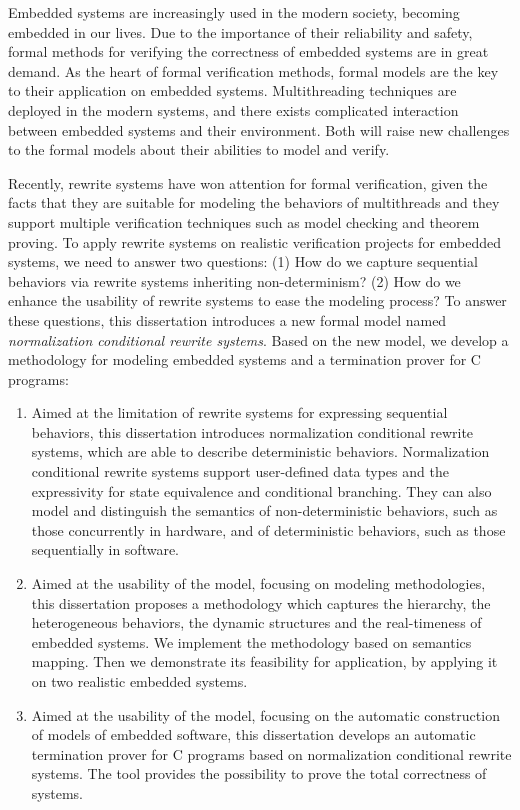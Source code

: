 \begin{eabstract}

Embedded systems are increasingly used in the modern society, becoming 
embedded in our lives. Due to the importance of their reliability and safety, 
formal methods for verifying the correctness of embedded systems are in great demand. As the heart of formal verification methods, formal models are the key to their application on embedded systems. Multithreading techniques are deployed in the modern systems, and there exists complicated interaction between embedded systems and their environment. Both will raise new challenges to the formal models about their abilities to model and verify.

Recently, rewrite systems have won attention for formal verification, given the facts that they are suitable for modeling the behaviors of multithreads and they support multiple verification techniques such as model checking and theorem proving. To apply rewrite systems on realistic verification projects for embedded systems, we need to answer two questions: (1) How do we capture sequential behaviors via rewrite systems inheriting non-determinism? (2) How do we enhance the usability of rewrite systems to ease the modeling process? To answer these questions, this dissertation introduces a new formal model named \emph{normalization conditional rewrite systems}. Based on the new model, we develop a methodology for modeling embedded systems and a termination prover \CTerm\xspace for C programs: 

\begin{enumerate}
\item Aimed at the limitation of rewrite systems for expressing sequential behaviors, this dissertation introduces normalization conditional rewrite systems, which are able to describe deterministic behaviors. Normalization conditional rewrite systems support user-defined data types and the expressivity for state equivalence and conditional branching. They can also model and distinguish the semantics of non-deterministic behaviors, such as those concurrently in hardware, and of deterministic behaviors, such as those sequentially in software. 
\item Aimed at the usability of the model, focusing on modeling methodologies, this dissertation proposes a methodology which captures the hierarchy, the heterogeneous behaviors, the dynamic structures and the real-timeness of embedded systems. We implement the methodology based on semantics mapping. Then we demonstrate its feasibility for application, by applying it on two realistic embedded systems. 
\item Aimed at the usability of the model, focusing on the automatic construction of models of embedded software, this dissertation develops an automatic termination prover \CTerm\xspace for C programs based on normalization conditional rewrite systems. The tool provides the possibility to prove the total correctness of systems. 
\end{enumerate}


\end{eabstract}
